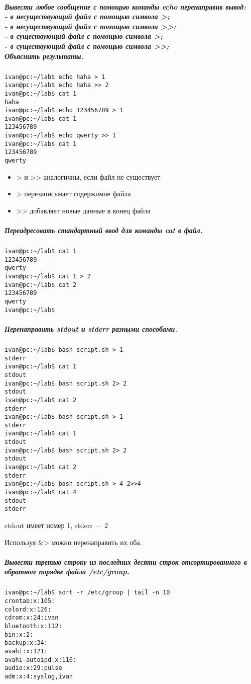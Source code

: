 \subparagraph{Вывести любое сообщение с помощью команды echo перенаправив вывод:\\
- в несуществующий файл с помощью символа >;\\
- в несуществующий файл с помощью символа >{}>;\\
- в существующий файл с помощью символа >;\\
- в существующий файл с помощью символа >{}>;\\
Объяснить результаты.}

\begin{verbatim}
ivan@pc:~/lab$ echo haha > 1
ivan@pc:~/lab$ echo haha >> 2
ivan@pc:~/lab$ cat 1
haha
ivan@pc:~/lab$ echo 123456789 > 1
ivan@pc:~/lab$ cat 1
123456789
ivan@pc:~/lab$ echo qwerty >> 1
ivan@pc:~/lab$ cat 1
123456789
qwerty
\end{verbatim}

\begin{itemize}
    \item > и >{}> аналогичны, если файл не существует
    \item > перезаписывает содержимое файла
    \item >{}> добавляет новые данные в конец файла
\end{itemize}

\subparagraph{Переадресовать стандартный ввод для команды cat в файл.}
\begin{verbatim}
ivan@pc:~/lab$ cat 1
123456789
qwerty
ivan@pc:~/lab$ cat 1 > 2
ivan@pc:~/lab$ cat 2
123456789
qwerty
ivan@pc:~/lab$
\end{verbatim}

\subparagraph{Перенаправить stdout и stderr разными способами.}
\begin{verbatim}
ivan@pc:~/lab$ bash script.sh > 1
stderr
ivan@pc:~/lab$ cat 1
stdout
ivan@pc:~/lab$ bash script.sh 2> 2
stdout
ivan@pc:~/lab$ cat 2
stderr
ivan@pc:~/lab$ bash script.sh > 1
stderr
ivan@pc:~/lab$ cat 1
stdout
ivan@pc:~/lab$ bash script.sh 2> 2
stdout
ivan@pc:~/lab$ cat 2
stderr
ivan@pc:~/lab$ bash script.sh > 4 2>>4
ivan@pc:~/lab$ cat 4
stdout
stderr
\end{verbatim}

stdout имеет номер 1, stderr --- 2

Используя \&> можно перенаправить их оба.

\subparagraph{Вывести третью строку из последних десяти строк отсортированного в
обратном порядке файла /etc/group.}

\begin{verbatim}
ivan@pc:~/lab$ sort -r /etc/group | tail -n 10
crontab:x:105:
colord:x:126:
cdrom:x:24:ivan
bluetooth:x:112:
bin:x:2:
backup:x:34:
avahi:x:121:
avahi-autoipd:x:116:
audio:x:29:pulse
adm:x:4:syslog,ivan
\end{verbatim}


